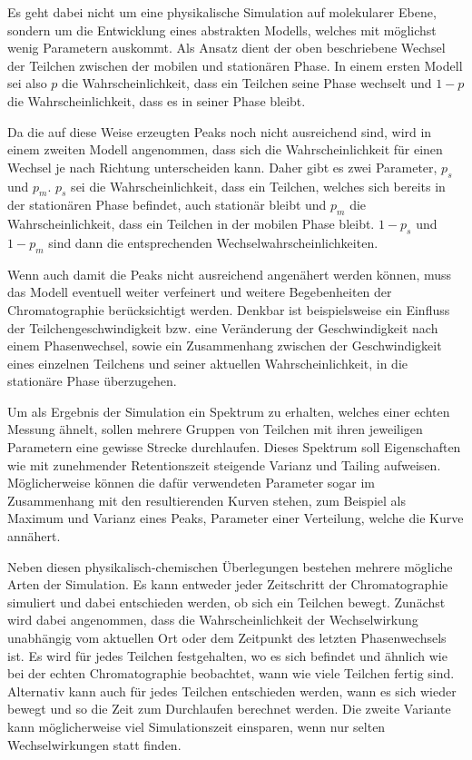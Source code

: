 \documentclass[a4paper,11pt]{article}
\begin{document}
Es geht dabei nicht um eine physikalische Simulation auf molekularer Ebene, sondern um die Entwicklung eines abstrakten Modells, welches mit möglichst wenig Parametern auskommt. Als Ansatz dient der oben beschriebene Wechsel der Teilchen zwischen der mobilen und stationären Phase. In einem ersten Modell sei also $p$ die Wahrscheinlichkeit, dass ein Teilchen seine Phase wechselt und $1-p$ die Wahrscheinlichkeit, dass es in seiner Phase bleibt. 

Da die auf diese Weise erzeugten Peaks noch nicht ausreichend sind, wird in einem zweiten Modell angenommen, dass sich die Wahrscheinlichkeit für einen Wechsel je nach Richtung unterscheiden kann. Daher gibt es zwei Parameter, $p_s$ und $p_m$. $p_s$ sei die Wahrscheinlichkeit, dass ein Teilchen, welches sich bereits in der stationären Phase befindet, auch stationär bleibt und $p_m$ die Wahrscheinlichkeit, dass ein Teilchen in der mobilen Phase bleibt. $1-p_s$ und $1-p_m$ sind dann die entsprechenden Wechselwahrscheinlichkeiten. 

Wenn auch damit die Peaks nicht ausreichend angenähert werden können, muss das Modell eventuell weiter verfeinert und weitere Begebenheiten der Chromatographie berücksichtigt werden. Denkbar ist beispielsweise ein Einfluss der Teilchengeschwindigkeit bzw. eine Veränderung der Geschwindigkeit nach einem Phasenwechsel, sowie ein Zusammenhang zwischen der Geschwindigkeit eines einzelnen Teilchens und seiner aktuellen Wahrscheinlichkeit, in die stationäre Phase überzugehen. 

Um als Ergebnis der Simulation ein Spektrum zu erhalten, welches einer echten Messung ähnelt, sollen mehrere Gruppen von Teilchen mit ihren jeweiligen Parametern eine gewisse Strecke durchlaufen. Dieses Spektrum soll Eigenschaften wie mit zunehmender Retentionszeit steigende Varianz und Tailing aufweisen. 
Möglicherweise können die dafür verwendeten Parameter sogar im Zusammenhang mit den resultierenden Kurven stehen, zum Beispiel als Maximum und Varianz eines Peaks, Parameter einer Verteilung, welche die Kurve annähert. %


Neben diesen physikalisch-chemischen Überlegungen bestehen mehrere mögliche Arten der Simulation. Es kann entweder jeder Zeitschritt der Chromatographie simuliert und dabei entschieden werden, ob sich ein Teilchen bewegt. Zunächst wird dabei angenommen, dass die Wahrscheinlichkeit der Wechselwirkung unabhängig vom aktuellen Ort oder dem Zeitpunkt des letzten Phasenwechsels ist. Es wird für jedes Teilchen festgehalten, wo es sich befindet und ähnlich wie bei der echten Chromatographie beobachtet, wann wie viele Teilchen fertig sind. Alternativ kann auch für jedes Teilchen entschieden werden, wann es sich wieder bewegt und so die Zeit zum Durchlaufen berechnet werden. Die zweite Variante kann möglicherweise viel Simulationszeit einsparen, wenn nur selten Wechselwirkungen statt finden.
\end{document}
